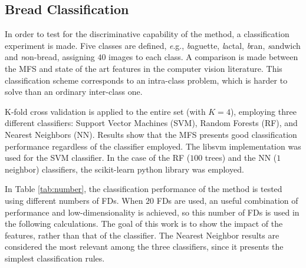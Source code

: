 



\subsection{Bread Classification}
\label{sec:10}

In order to test for the discriminative capability of the method, a classification experiment is made. Five classes are defined, {\emph e.g.}, {\emph baguette}, {\emph lactal}, {\emph bran}, {\emph sandwich} and {\emph non-bread}, assigning $40$ images to each class. A comparison is made between the MFS and state of the art features in the computer vision literature. This classification scheme corresponds to an intra-class problem, which is harder to solve than an ordinary inter-class one. 

K-fold cross validation is applied to the entire set (with $K=4$), employing three different classifiers: Support Vector Machines (SVM), Random Forests (RF), and Nearest Neighbors (NN). Results show that the MFS presents good classification performance regardless of the classifier employed. The libsvm implementation \cite{Chang2011} was used for the SVM classifier. In the case of the RF ($100$ trees) and the NN ($1$ neighbor) classifiers, the scikit-learn python library was employed.

In Table \ref{tab:number}, the classification performance of the method is tested using different numbers of FDs. When $20$ FDs are used, an useful combination of performance and low-dimensionality is achieved, so this number of FDs is used in the following calculations. The goal of this work is to show the impact of the features, rather than that of the classifier. The Nearest Neighbor results are considered the most relevant among the three classifiers, since it presents the simplest classification rules.


